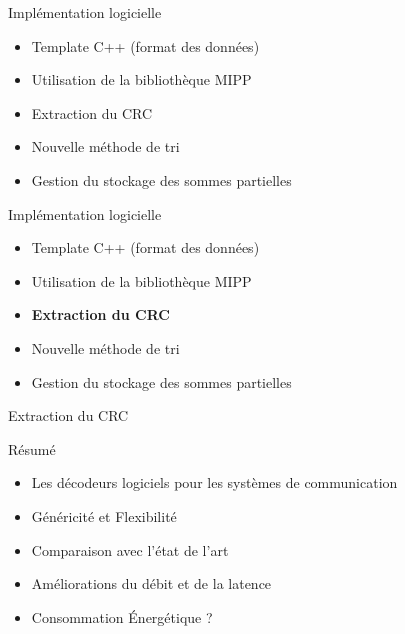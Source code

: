 \documentclass[t,compress,mathserif,12pt,xcolor=dvipsnames]{beamer}
\begin{document}
\begin{frame}[c]{Implémentation logicielle}
	\begin{itemize}
		\vfill
		\item Template C++ (format des données)
		\vfill
		\item Utilisation de la bibliothèque MIPP
		\vfill
		\item Extraction du CRC
		\vfill
		\item Nouvelle méthode de tri
		\vfill
		\item Gestion du stockage des sommes partielles
		\vfill
	\end{itemize}
\end{frame}


\begin{frame}[c]{Implémentation logicielle}
	\begin{itemize}
		\vfill
		\item Template C++ (format des données)
		\vfill
		\item Utilisation de la bibliothèque MIPP
		\vfill
		\item \textbf{Extraction du CRC}
		\vfill
		\item Nouvelle méthode de tri
		\vfill
		\item Gestion du stockage des sommes partielles
		\vfill
	\end{itemize}
\end{frame}


\begin{frame}[c]{Extraction du CRC}
	\centering
\end{frame}

\begin{frame}[c]{Résumé}
	\begin{itemize}
		\vfill
		\item Les décodeurs logiciels pour les systèmes de communication
		\vfill
		\item Généricité et Flexibilité
		\vfill
		\item Comparaison avec l'état de l'art
		\vfill
		\item Améliorations du débit et de la latence
		\vfill
		\item Consommation \'Energétique ?
		\vfill
	\end{itemize}
\end{frame}
\end{document}
